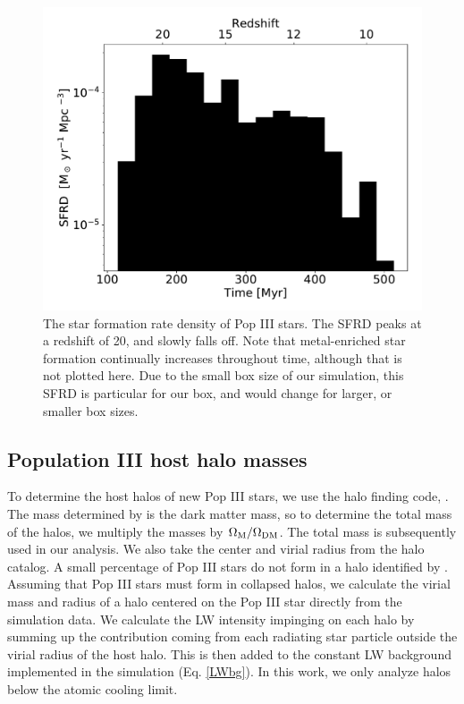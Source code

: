\documentclass[a4paper,fleqn,usenatbib]{mnras}
\begin{document}
\begin{figure}
	\includegraphics[width=\columnwidth]{images/pop3_SFR_bar.pdf}
    \caption{The star formation rate density of Pop III stars. The SFRD peaks at a redshift of 20, and slowly falls off. Note that metal-enriched star formation continually increases throughout time, although that is not plotted here. Due to the small box size of our simulation, this SFRD is particular for our box, and would change for larger, or smaller box sizes.}
    \label{fig:pop3_SFR_bar}
\end{figure}

\subsection{Population III host halo masses}
 To determine the host halos of new Pop III stars, we use the halo finding code, \rockstar{} \citep{rockstar}. The mass determined by \rockstar{} is the dark matter mass, so to determine the total mass of the halos, we multiply the masses by $\Omega_{\rm M}/\Omega_{\rm DM}$. The total mass is subsequently used in our analysis. We also take the center and virial radius from the \rockstar{} halo catalog. A small percentage of Pop III stars do not form in a halo identified by \rockstar{}. Assuming that Pop III stars must form in collapsed halos, we calculate the virial mass and radius of a halo centered on the Pop III star directly from the simulation data. We calculate the LW intensity impinging on each halo by summing up the contribution coming from each radiating star particle outside the virial radius of the host halo. This is then added to the constant LW background implemented in the simulation (Eq. \ref{LWbg}). In this work, we only analyze halos below the atomic cooling limit. 
\end{document}
